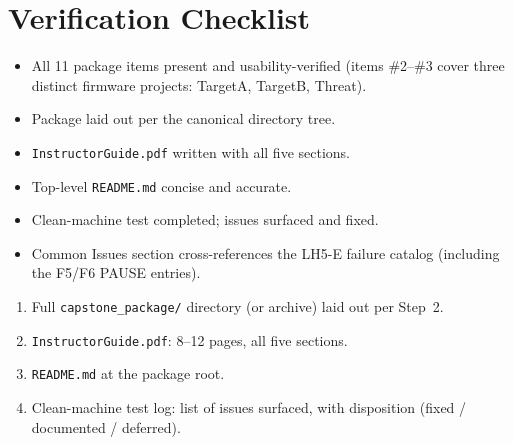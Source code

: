 \documentclass[11pt,letterpaper]{article}
\begin{document}
\section{Verification Checklist}
\begin{itemize}[leftmargin=2em]
	\item[$\square$] All 11 package items present and usability-verified (items \#2--\#3 cover three distinct firmware projects: TargetA, TargetB, Threat).
	\item[$\square$] Package laid out per the canonical directory tree.
	\item[$\square$] \texttt{InstructorGuide.pdf} written with all five sections.
	\item[$\square$] Top-level \texttt{README.md} concise and accurate.
	\item[$\square$] Clean-machine test completed; issues surfaced and fixed.
	\item[$\square$] Common Issues section cross-references the LH5-E failure catalog (including the F5/F6 PAUSE entries).
\end{itemize}

\begin{tcolorbox}[deliverable={Lab Handout 5-F Deliverable --- and Session 19 Final Deliverable}]
	\begin{enumerate}[leftmargin=1.2em]
		\item Full \texttt{capstone\_package/} directory (or archive) laid out per Step~2.
		\item \texttt{InstructorGuide.pdf}: 8--12 pages, all five sections.
		\item \texttt{README.md} at the package root.
		\item Clean-machine test log: list of issues surfaced, with disposition (fixed / documented / deferred).
	\end{enumerate}
\end{tcolorbox}

\printhandoutglossary
\end{document}
